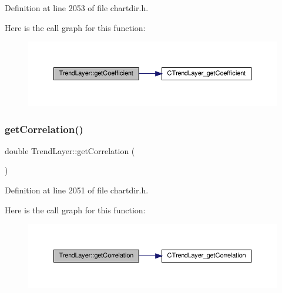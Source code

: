 Definition at line 2053 of file chartdir.\+h.

Here is the call graph for this function\+:
\nopagebreak
\begin{figure}[H]
\begin{center}
\leavevmode
\includegraphics[width=350pt]{class_trend_layer_a7ff42064c53aefd537e89fdc66e9bf79_cgraph}
\end{center}
\end{figure}
\mbox{\label{class_trend_layer_a588bb389e19585344439f85423c614fc}} 
\subsubsection{\texorpdfstring{get\+Correlation()}{getCorrelation()}}
{\footnotesize\ttfamily double Trend\+Layer\+::get\+Correlation (\begin{DoxyParamCaption}{ }\end{DoxyParamCaption})\hspace{0.3cm}{\ttfamily [inline]}}



Definition at line 2051 of file chartdir.\+h.

Here is the call graph for this function\+:
\nopagebreak
\begin{figure}[H]
\begin{center}
\leavevmode
\includegraphics[width=350pt]{class_trend_layer_a588bb389e19585344439f85423c614fc_cgraph}
\end{center}
\end{figure}
\mbox{\label{class_trend_layer_aed613d07e0863cacf976363ea5fe739f}} 

